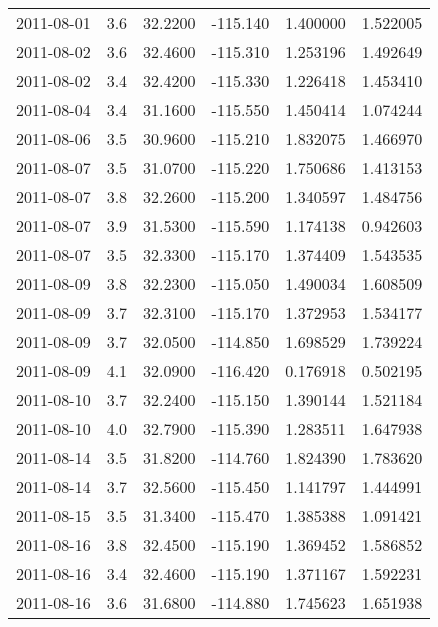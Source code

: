 \begin{tabular}{lrrrrr}
2011-08-01 &       3.6 &  32.2200 &  -115.140 &         1.400000 &         1.522005 \\
2011-08-02 &       3.6 &  32.4600 &  -115.310 &         1.253196 &         1.492649 \\
2011-08-02 &       3.4 &  32.4200 &  -115.330 &         1.226418 &         1.453410 \\
2011-08-04 &       3.4 &  31.1600 &  -115.550 &         1.450414 &         1.074244 \\
2011-08-06 &       3.5 &  30.9600 &  -115.210 &         1.832075 &         1.466970 \\
2011-08-07 &       3.5 &  31.0700 &  -115.220 &         1.750686 &         1.413153 \\
2011-08-07 &       3.8 &  32.2600 &  -115.200 &         1.340597 &         1.484756 \\
2011-08-07 &       3.9 &  31.5300 &  -115.590 &         1.174138 &         0.942603 \\
2011-08-07 &       3.5 &  32.3300 &  -115.170 &         1.374409 &         1.543535 \\
2011-08-09 &       3.8 &  32.2300 &  -115.050 &         1.490034 &         1.608509 \\
2011-08-09 &       3.7 &  32.3100 &  -115.170 &         1.372953 &         1.534177 \\
2011-08-09 &       3.7 &  32.0500 &  -114.850 &         1.698529 &         1.739224 \\
2011-08-09 &       4.1 &  32.0900 &  -116.420 &         0.176918 &         0.502195 \\
2011-08-10 &       3.7 &  32.2400 &  -115.150 &         1.390144 &         1.521184 \\
2011-08-10 &       4.0 &  32.7900 &  -115.390 &         1.283511 &         1.647938 \\
2011-08-14 &       3.5 &  31.8200 &  -114.760 &         1.824390 &         1.783620 \\
2011-08-14 &       3.7 &  32.5600 &  -115.450 &         1.141797 &         1.444991 \\
2011-08-15 &       3.5 &  31.3400 &  -115.470 &         1.385388 &         1.091421 \\
2011-08-16 &       3.8 &  32.4500 &  -115.190 &         1.369452 &         1.586852 \\
2011-08-16 &       3.4 &  32.4600 &  -115.190 &         1.371167 &         1.592231 \\
2011-08-16 &       3.6 &  31.6800 &  -114.880 &         1.745623 &         1.651938 \\

\end{tabular}

